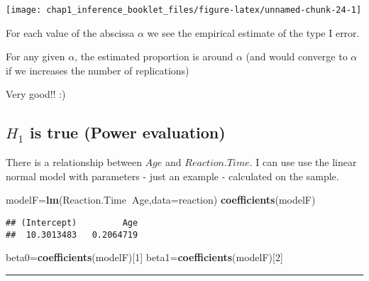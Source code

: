 \documentclass[]{article}
\newenvironment{Shaded}{\begin{snugshade}}{\end{snugshade}}
\newcommand{\KeywordTok}[1]{\textcolor[rgb]{0.13,0.29,0.53}{\textbf{#1}}}
\newcommand{\DataTypeTok}[1]{\textcolor[rgb]{0.13,0.29,0.53}{#1}}
\newcommand{\DecValTok}[1]{\textcolor[rgb]{0.00,0.00,0.81}{#1}}
\newcommand{\OperatorTok}[1]{\textcolor[rgb]{0.81,0.36,0.00}{\textbf{#1}}}
\newcommand{\NormalTok}[1]{#1}
\begin{document}
\begin{center}\texttt{[image: chap1\_inference\_booklet\_files/figure-latex/unnamed-chunk-24-1]} \end{center}

For each value of the abscissa \(\alpha\) we see the empirical estimate
of the type I error.

For any given \(\alpha\), the estimated proportion is around \(\alpha\)
(and would converge to \(\alpha\) if we increases the number of
replications)

Very good!! :)

\subsection{\texorpdfstring{\(H_1\) is true (Power
evaluation)}{H\_1 is true (Power evaluation)}}\label{h_1-is-true-power-evaluation}

There is a relationship between \(Age\) and \(Reaction.Time\). I can use
use the linear normal model with parameters - just an example -
calculated on the sample.

\begin{Shaded}
\begin{Highlighting}[]
\NormalTok{modelF=}\KeywordTok{lm}\NormalTok{(Reaction.Time}\OperatorTok{~}\NormalTok{Age,}\DataTypeTok{data=}\NormalTok{reaction)}
\KeywordTok{coefficients}\NormalTok{(modelF)}
\end{Highlighting}
\end{Shaded}

\begin{verbatim}
## (Intercept)         Age 
##  10.3013483   0.2064719
\end{verbatim}

\begin{Shaded}
\begin{Highlighting}[]
\NormalTok{beta0=}\KeywordTok{coefficients}\NormalTok{(modelF)[}\DecValTok{1}\NormalTok{]}
\NormalTok{beta1=}\KeywordTok{coefficients}\NormalTok{(modelF)[}\DecValTok{2}\NormalTok{]}
\end{Highlighting}
\end{Shaded}

\begin{center}\rule{0.5\linewidth}{\linethickness}\end{center}
\end{document}

